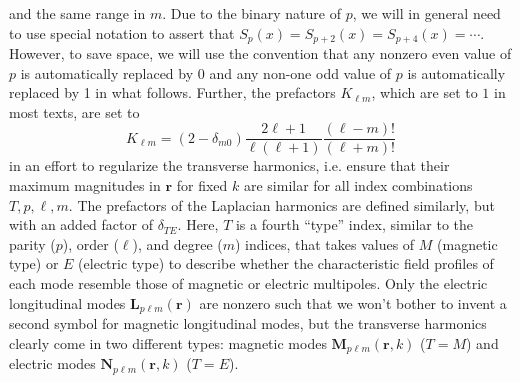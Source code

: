 \documentclass{article}
\begin{document}
and the same range in $m$. Due to the binary nature of $p$, we will in general need to use special notation to assert that $S_p(x) = S_{p + 2}(x) = S_{p+4}(x) = \cdots$. However, to save space, we will use the convention that any nonzero even value of $p$ is automatically replaced by 0 and any non-one odd value of $p$ is automatically replaced by 1 in what follows. Further, the prefactors $K_{\ell m}$, which are set to $1$ in most texts, are set to
\begin{equation}
K_{\ell m} = (2 - \delta_{m0})\frac{2\ell + 1}{\ell(\ell + 1)}\frac{(\ell - m)!}{(\ell + m)!}
\end{equation}
in an effort to regularize the transverse harmonics, i.e. ensure that their maximum magnitudes in $\mathbf{r}$ for fixed $k$ are similar for all index combinations $T,p,\ell,m$. The prefactors of the Laplacian harmonics are defined similarly, but with an added factor of $\delta_{TE}$. Here, $T$ is a fourth ``type'' index, similar to the parity ($p$), order ($\ell$), and degree ($m$) indices, that takes values of $M$ (magnetic type) or $E$ (electric type) to describe whether the characteristic field profiles of each mode resemble those of magnetic or electric multipoles. Only the electric longitudinal modes $\mathbf{L}_{p\ell m}(\mathbf{r})$ are nonzero such that we won't bother to invent a second symbol for magnetic longitudinal modes, but the transverse harmonics clearly come in two different types: magnetic modes $\mathbf{M}_{p\ell m}(\mathbf{r},k)$ ($T = M$) and electric modes $\mathbf{N}_{p\ell m}(\mathbf{r},k)$ ($T = E$).
\end{document}
